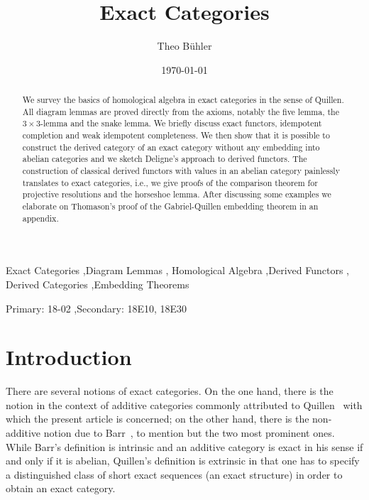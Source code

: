 \documentclass[1p]{elsarticle}
\title{Exact Categories}
\author{Theo B\"uhler}
\date{\today}
\theoremstyle{mythm}
\theoremstyle{mydef}
\begin{document}

\begin{abstract}
  We survey the basics of homological algebra in exact categories
  in the sense of Quillen. All diagram lemmas are proved
  directly from the axioms, notably the five lemma, the 
  $3\times 3$-lemma and the snake lemma. We briefly discuss exact
  functors, idempotent completion and weak idempotent completeness.
  We then show that it is possible
  to construct the derived category of an exact category without
  any embedding into abelian categories and we sketch Deligne's approach
  to derived functors.
  The construction of classical derived functors with 
  values in an abelian category painlessly translates to exact
  categories, i.e., we give proofs of the comparison theorem for
  projective resolutions and the horseshoe lemma. 
  After discussing some examples
  we elaborate on Thomason's proof of the Gabriel-Quillen
  embedding theorem in an appendix.
\end{abstract}


\begin{keyword}
  Exact Categories \sep Diagram Lemmas \sep 
  Homological Algebra \sep Derived Functors \sep
  Derived Categories \sep Embedding Theorems
  
  \MSC Primary: 18-02 \sep Secondary: 18E10, 18E30
\end{keyword}
\maketitle

\tableofcontents

\section{Introduction}

There are several notions of exact categories. On the one hand, there
is the notion in the context of additive categories commonly
attributed to Quillen~\cite{MR0338129} with which the present article
is concerned; on the other hand, there is the non-additive notion due
to Barr~\cite{barr-exact}, to mention but the two most prominent
ones. While Barr's definition is intrinsic and an additive category is 
exact in his sense if and only if it is abelian, Quillen's
definition is extrinsic in that one has to specify a distinguished 
class of short exact sequences (an exact structure) in order to
obtain an exact category.
\end{document}
